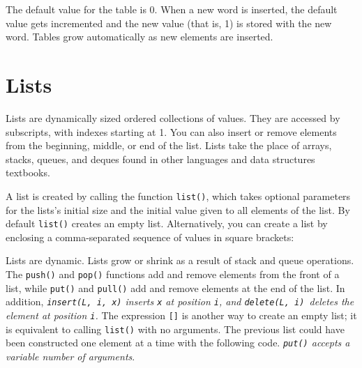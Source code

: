 
The default value for the table is 0. When a new word is inserted, the
default value gets incremented and the new value (that is, 1) is stored
with the new word. Tables grow automatically as new elements are
inserted.

\section{Lists}

Lists are dynamically sized ordered
collections of values. They are accessed by subscripts, with indexes
starting at 1. You can also insert or remove
elements from the beginning, middle, or end of the list. Lists take the
place of arrays, stacks, queues,
and deques found in other languages and data structures
textbooks.

A list is created by calling the function \texttt{list()}, which
takes optional parameters for the lists's initial size and the initial value
given to all elements of the list.  By default \texttt{list()} creates an empty
list. Alternatively, you can create a list by enclosing a comma-separated
sequence of values in square brackets:


Lists are dynamic. Lists grow or shrink as a result
of stack and queue operations. The \texttt{push()} and
\texttt{pop()} functions add and remove elements from the
front of a list, while \texttt{put()} and
\texttt{pull()} add and remove elements at the end of
the list. In addition,
{\em {}\texttt{insert(L, i, x)} inserts
\texttt{x} at position \texttt{i}, and
\texttt{delete(L, i)}\texttt{ }deletes the element
at position \texttt{i}.\/}
The expression \texttt{[]} is another
way to create an empty list; it is equivalent to
calling \texttt{list()} with no arguments.
The previous list could have been constructed one element at
a time with the following code.
{\em \texttt{put()} accepts a variable number of arguments\/}.


